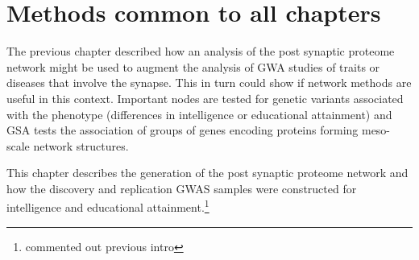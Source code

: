 \chapter{Methods common to all chapters}




The previous chapter described how an analysis of the post synaptic proteome network might be used to augment the analysis of GWA studies of traits or diseases that involve the synapse. This in turn could show if network methods are useful in this context.  Important nodes are tested for genetic variants associated with the phenotype (differences in intelligence or educational attainment) and GSA tests the association of  groups of genes encoding proteins forming meso-scale network structures. 

This chapter describes the generation of the post synaptic proteome network and how the discovery and replication GWAS samples were constructed  for intelligence and educational attainment.\footnote{commented out previous intro}






